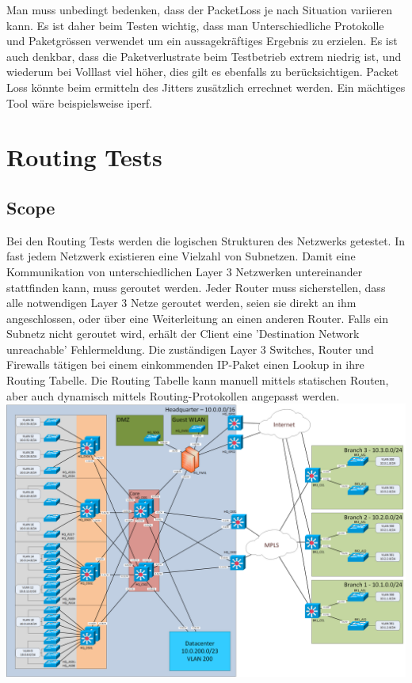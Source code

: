 \documentclass[a4,12pt]{scrartcl}
\begin{document}
\noindent Man muss unbedingt bedenken, dass der PacketLoss je nach Situation variieren kann. Es ist daher beim Testen wichtig, dass man Unterschiedliche Protokolle und Paketgrössen verwendet um ein aussagekräftiges Ergebnis zu erzielen. Es ist auch denkbar, dass die Paketverlustrate beim Testbetrieb extrem niedrig ist, und wiederum bei Volllast viel höher, dies gilt es ebenfalls zu berücksichtigen. Packet Loss könnte beim ermitteln des Jitters zusätzlich errechnet werden. Ein mächtiges Tool wäre beispielsweise iperf.
\newpage
\section{Routing Tests}
\subsection{Scope}
Bei den Routing Tests werden die logischen Strukturen des Netzwerks getestet. In fast jedem Netzwerk existieren eine Vielzahl von Subnetzen. Damit eine Kommunikation von unterschiedlichen Layer 3 Netzwerken untereinander stattfinden kann, muss geroutet werden. Jeder Router muss sicherstellen, dass alle notwendigen Layer 3 Netze geroutet werden, seien sie direkt an ihm angeschlossen, oder über eine Weiterleitung an einen anderen Router. Falls ein Subnetz nicht geroutet wird, erhält der Client eine 'Destination Network unreachable' Fehlermeldung. Die zuständigen Layer 3 Switches, Router und Firewalls tätigen bei einem einkommenden IP-Paket einen Lookup in ihre Routing Tabelle. Die Routing Tabelle kann manuell mittels statischen Routen, aber auch dynamisch mittels Routing-Protokollen angepasst werden.\\

\includegraphics[width=1\textwidth]{figures/Netzwerk_logisch.png}\\
\end{document}
